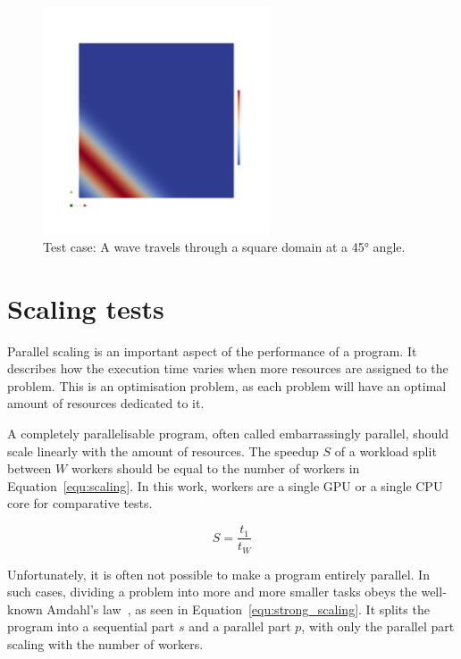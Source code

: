 \begin{figure}[H]
	\centering
	\includegraphics[width=0.6\textwidth]{Chapter_results/media/problem_1}
	\caption{Test case: A wave travels through a square domain at a 45° angle.}
	\label{fig:problem}
\end{figure}

\section{Scaling tests} \label{section:results:scaling_tests}

Parallel scaling is an important aspect of the performance of a program. It describes how the
execution time varies when more resources are assigned to the problem. This is an optimisation
problem, as each problem will have an optimal amount of resources dedicated to it. 

A completely parallelisable program, often called embarrassingly parallel, should scale linearly
with the amount of resources. The speedup $S$ of a workload split between $W$ workers should be
equal to the number of workers in Equation~\ref{equ:scaling}. In this work, workers are a single GPU
or a single CPU core for comparative tests.

\begin{equation} \label{equ:scaling}
	S = \frac{t_1}{t_W}
\end{equation}

Unfortunately, it is often not possible to make a program entirely parallel. In such cases, dividing
a problem into more and more smaller tasks obeys the well-known Amdahl's law~\cite{Amdahl1967}, as
seen in Equation~\ref{equ:strong_scaling}. It splits the program into a sequential part $s$ and a parallel
part $p$, with only the parallel part scaling with the number of workers.

